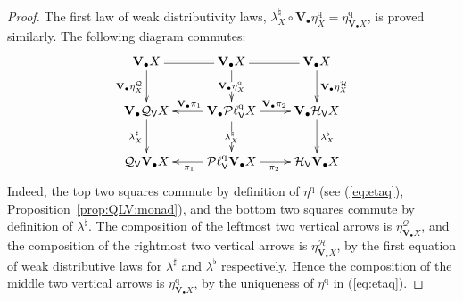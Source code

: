 \documentclass[preprint,12pt]{elsarticle}
\newcommand\Smyth{{\mathcal Q}}
\newcommand\Hoare{{\mathcal H}}
\newcommand\Vt{\mathsf{V}}
\newcommand\HV{\Hoare_\Vt}
\newcommand\SV{\Smyth_{\Vt}}
\newcommand\quasi{\mathrm{q}} %
\newcommand\QL{\Plotkin^\quasi}
\newcommand\QLV{\QL_\Vt}
\newcommand\Plotkin{\mathcal P\ell} %
\newcommand\Val{{\mathbf V}}
\begin{document}
\begin{proof}
  The first law of weak distributivity laws,
  ${\lambda^\natural_X} \circ \Val_\bullet {\eta^\quasi_X} =
  \eta^\quasi_{\Val_\bullet X}$, is proved similarly.
  The following diagram commutes:
  \[
    \xymatrix{
      \Val_\bullet X
      \ar[d]_{\Val_\bullet {\eta^\Smyth_X}}
      &
      \Val_\bullet X
      \ar@{=}[l]
      \ar[d]|{\Val_\bullet {\eta^\quasi_X}}
      \ar@{=}[r]
      &
      \Val_\bullet X
      \ar[d]^{\Val_\bullet {\eta^\Hoare_X}}
      \\
      \Val_\bullet {\SV X}
      \ar[d]_{\lambda^\sharp_X}
      & \Val_\bullet {\QLV X}
      \ar[l]_{\Val_\bullet {\pi_1}}
      \ar[d]|{\lambda^\natural_X}
      \ar[r]^{\Val_\bullet {\pi_2}}
      & \Val_\bullet {\HV X}
      \ar[d]^{\lambda^\flat_X}
      \\
      \SV {\Val_\bullet X}
      & \QLV {\Val_\bullet X}
      \ar[l]^{\pi_1}
      \ar[r]_{\pi_2}
      & \HV {\Val_\bullet X}
      }
    \]
    Indeed, the top two squares commute by definition of $\eta^\quasi$
    (see (\ref{eq:etaq}), Proposition~\ref{prop:QLV:monad}), and the
    bottom two squares commute by definition of $\lambda^\natural$.
    The composition of the leftmost two vertical arrows is
    $\eta^\Smyth_{\Val_\bullet X}$, and the composition of the
    rightmost two vertical arrows is $\eta^\Hoare_{\Val_\bullet X}$,
    by the first equation of weak distributive laws for
    $\lambda^\sharp$ and $\lambda^\flat$ respectively.  Hence the
    composition of the middle two vertical arrows is
    $\eta^\quasi_{\Val_\bullet X}$, by the uniqueness of $\eta^\quasi$
    in (\ref{eq:etaq}).
  

\end{proof}
\end{document}
